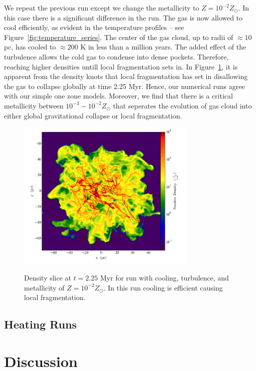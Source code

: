 \documentclass[useAMS,usenatbib]{mn2e}
\begin{document}
We repeat the previous run except we change the metallicity to $Z=10^{-2}Z_\odot$. In this case there is a significant difference in the run.
The gas is now allowed to cool efficiently, as evident in the temperature profiles -- see Figure~\ref{fig:temperature_series}. The center
of the gas cloud, up to radii of $\approx 10$ pc, has cooled to $\approx 200$ K in less than a million years. The added effect of the turbulence
allows the cold gas to condense into dense pockets. Therefore, reaching higher densities untill local fragmentation sets in.
In Figure~\ref{fig:density_turbulence_0_01}, it is apparent from the density knots that local fragmentation has set in disallowing the gas
to collapse globally at time 2.25 Myr. Hence, our numerical runs agree with our simple one zone models. Moreover, we find that there is a critical metallicity
between $10^{-3}-10^{-2}Z_\odot$ that seperates the evolution of gas cloud into either global gravitational collapse or local fragmentation. 
\begin{figure}
\begin{center}
\mbox{\includegraphics[width=8.5cm]{Images/density_slice_0_01}}
\end{center}
\caption{\label{fig:density_turbulence_0_01}} Density slice at $t=2.25$ Myr for run with
cooling, turbulence, and metallicity of $Z=10^{-2}Z_\odot$. In this run cooling is
efficient causing local fragmentation. 
\end{figure}

 
\subsection{Heating Runs}

% 
\section{Discussion}
\label{sec:discussion}
\end{document}
